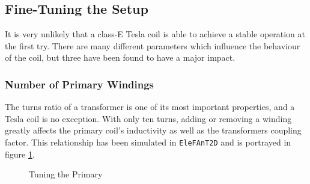 \subsection{Fine-Tuning the Setup} %

It is very unlikely that a class-E Tesla coil is able to achieve a stable operation at the first try. There are many different parameters which influence the behaviour of the coil, but three have been found to have a major impact.

\subsubsection{Number of Primary Windings}

The turns ratio of a transformer is one of its most important properties, and a Tesla coil is no exception. With only ten turns, adding or removing a winding greatly affects the primary coil's inductivity as well as the transformers coupling factor. This relationship has been simulated in \texttt{EleFAnT2D} and is portrayed in figure \ref{fig:tuning-the-primary}.

\begin{figure}
    \centering
    \caption{Tuning the Primary}
    \label{fig:tuning-the-primary}
\end{figure}

